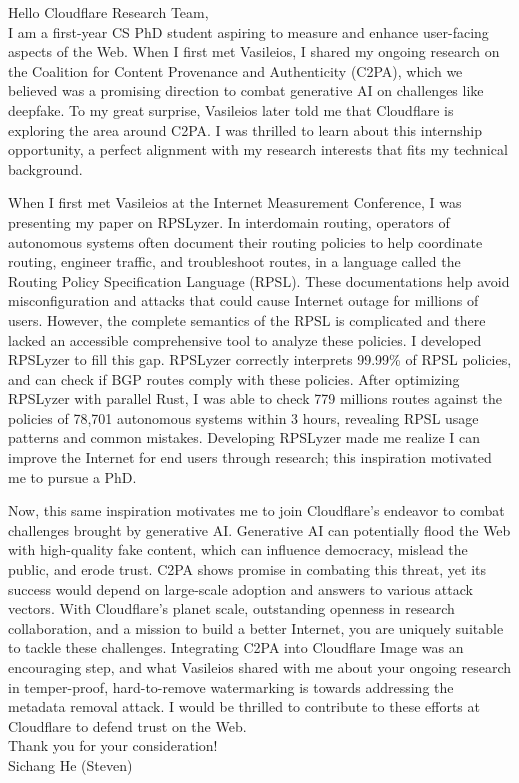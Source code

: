\documentclass[letterpaper,12pt]{article}
\begin{document}
Hello Cloudflare Research Team,
\\

I am a first-year CS PhD student aspiring to measure and
enhance user-facing aspects of the Web. When I first met Vasileios,
I shared my ongoing research on the Coalition for Content Provenance and
Authenticity (C2PA), which we believed was a promising direction to
combat generative AI on challenges like deepfake.
To my great surprise, Vasileios later told me that
Cloudflare is exploring the area around C2PA.
I was thrilled to learn about this internship opportunity,
a perfect alignment with my research interests that
fits my technical background.

When I first met Vasileios at the Internet Measurement Conference,
I was presenting my paper on RPSLyzer.
In interdomain routing, operators of
autonomous systems often document their routing policies to
help coordinate routing, engineer traffic, and troubleshoot routes, in
a language called the Routing Policy Specification Language (RPSL).
These documentations help avoid misconfiguration and attacks that
could cause Internet outage for millions of users.
However, the complete semantics of the RPSL is complicated and
there lacked an accessible comprehensive tool to analyze these policies.
I developed RPSLyzer to fill this gap.
RPSLyzer correctly interprets 99.99\% of RPSL policies, and can check if
BGP routes comply with these policies.
After optimizing RPSLyzer with parallel Rust, I was able to
check 779 millions routes against the policies of
78,701 autonomous systems within 3 hours, revealing RPSL usage patterns and
common mistakes.
Developing RPSLyzer made me realize I can improve the Internet for
end users through research; this inspiration motivated me to pursue a PhD.

Now, this same inspiration motivates me to join Cloudflare's endeavor to
combat challenges brought by generative AI.
Generative AI can potentially flood the Web with
high-quality fake content, which can influence democracy, mislead the public, and
erode trust.
C2PA shows promise in combating this threat, yet its success would depend on
large-scale adoption and answers to various attack vectors.
With Cloudflare's planet scale, outstanding openness in research collaboration, and
a mission to build a better Internet, you are uniquely suitable to
tackle these challenges.
Integrating C2PA into Cloudflare Image was an encouraging step, and
what Vasileios shared with me about your ongoing research in
temper-proof,
hard-to-remove watermarking is towards addressing the metadata removal attack.
I would be thrilled to contribute to these efforts at Cloudflare to
defend trust on the Web.
\\

Thank you for your consideration!\\
Sichang He (Steven)
\end{document}
